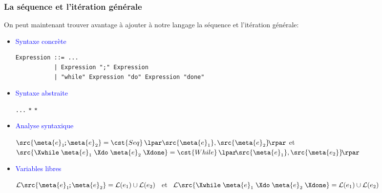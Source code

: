 %
\begin{frame}[containsverbatim]
\frametitle{La séquence et l'itération générale}

On peut maintenant trouver avantage à ajouter à notre langage la
séquence et l'itération générale:

\begin{itemize}

  \item \textcolor{blue}{Syntaxe concrète}
    {\small
     \begin{verbatim}
Expression ::= ...
           | Expression ";" Expression
           | "while" Expression "do" Expression "done"
     \end{verbatim}
    }
   \vspace*{-10pt}

  \item \textcolor{blue}{Syntaxe abstraite}

    {\small
     \Xtype {} \equal \texttt{...} \vbar{} 
     \Xof {} \texttt{*} 
     \vbar{}  \Xof {} \texttt{*}
     \semi{}
    }

  \item \textcolor{blue}{Analyse syntaxique}

    $\src{\meta{e}_1\!\texttt{;}
    \meta{e}_2} = \cst{Seq} \,
    \lpar\src{\meta{e}_1},\src{\meta{e}_2}\!\rpar$ et
    $\src{\Xwhile \; \meta{e}_1 \; \Xdo \; \meta{e}_2 \; \Xdone} =
    \cst{While} \, \lpar\!\src{\meta{e}_1},\src{\meta{e_2}}\!\rpar$

  \item \textcolor{blue}{Variables libres}

    ${\cal L} \src{\meta{e}_1\!\texttt{;}
    \meta{e}_2} = {\cal L} (e_1) \cup {\cal L} (e_2)$ \ et \ ${\cal L}
    \src{\Xwhile \; \meta{e}_1 \; \Xdo \; \meta{e}_2 \; \Xdone} =
    {\cal L} (e_1) \cup {\cal L} (e_2)$

\end{itemize}

\end{frame}

